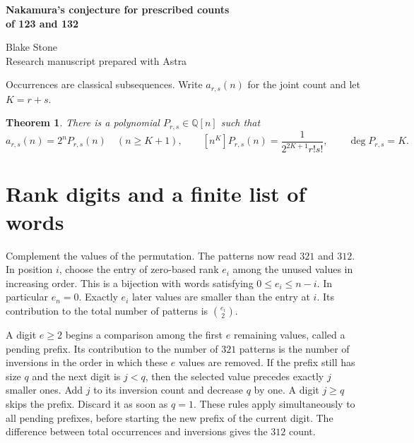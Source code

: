 \documentclass[11pt,letterpaper]{article}
\newtheorem{theorem}{Theorem}
\begin{document}
\thispagestyle{plain}
\begin{center}
{\LARGE\bfseries Nakamura's conjecture for prescribed counts\\[2pt] of 123 and 132\par}
\vspace{0.4em}Blake Stone\\{\small Research manuscript prepared with Astra}
\end{center}
\begin{abstract}
For every fixed $r,s\ge0$, the number of permutations with $r$ occurrences of $123$ and $s$ of $132$ equals $2^n$ times a polynomial of degree $r+s$ for every $n\ge r+s+1$. This proves Conjecture 1 of Nakamura (2013), including its proposed starting index. A finite decomposition of rank codes gives the polynomial and its leading coefficient. For longer patterns beginning with their smallest element, every fixed joint multiplicity vector has a rational generating function and an explicit leading asymptotic.
\end{abstract}

Occurrences are classical subsequences. Write $a_{r,s}(n)$ for the joint count and let $K=r+s$.
\begin{theorem}\label{main}
There is a polynomial $P_{r,s}\in\mathbb Q[n]$ such that
\[
 a_{r,s}(n)=2^nP_{r,s}(n)\quad(n\ge K+1),\qquad
 [n^K]P_{r,s}(n)=\frac{1}{2^{2K+1}r!s!},\qquad \deg P_{r,s}=K.
\]
\end{theorem}

\section{Rank digits and a finite list of words}
Complement the values of the permutation. The patterns now read $321$ and $312$. In position $i$, choose the entry of zero-based rank $e_i$ among the unused values in increasing order. This is a bijection with words satisfying $0\le e_i\le n-i$. In particular $e_n=0$. Exactly $e_i$ later values are smaller than the entry at $i$. Its contribution to the total number of patterns is $\binom{e_i}{2}$.

A digit $e\ge2$ begins a comparison among the first $e$ remaining values, called a pending prefix. Its contribution to the number of $321$ patterns is the number of inversions in the order in which these $e$ values are removed. If the prefix still has size $q$ and the next digit is $j<q$, then the selected value precedes exactly $j$ smaller ones. Add $j$ to its inversion count and decrease $q$ by one. A digit $j\ge q$ skips the prefix. Discard it as soon as $q=1$. These rules apply simultaneously to all pending prefixes, before starting the new prefix of the current digit. The difference between total occurrences and inversions gives the $312$ count.
\end{document}
